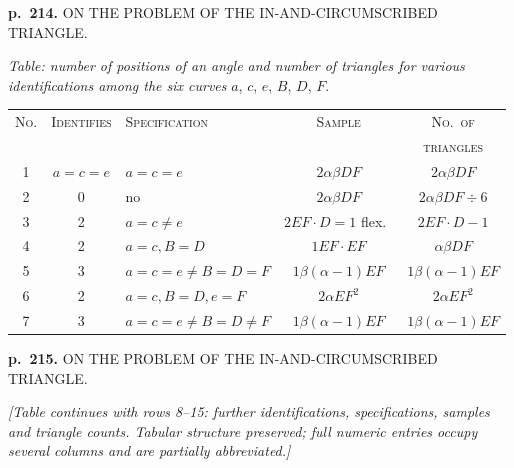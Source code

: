 \documentclass[11pt,a4paper]{book}
\begin{document}
\clearpage

\noindent
\textbf{p.~214.}  ON THE PROBLEM OF THE IN-AND-CIRCUMSCRIBED TRIANGLE.

\begin{center}
\textit{Table: number of positions of an angle and number of triangles for various identifications among the six curves} $a$, $c$, $e$, $B$, $D$, $F$.
\end{center}


\begin{center}
\begin{tabular}{cclcc}
\toprule
\textsc{No.} & \textsc{Identifies} & \textsc{Specification} & \textsc{Sample} & \textsc{No.\ of} \\
& & & & \textsc{triangles} \\
\midrule
1 & $a = c = e$ & $a = c = e$ & $2 \alpha \beta DF$ & $2\alpha\beta DF$ \\
2 & 0 & no & $2\alpha\beta DF$ & $2\alpha\beta DF \div 6$ \\
3 & 2 & $a = c \neq e$ & $2EF \cdot D = 1$ flex.\ & $2EF \cdot D - 1$ \\
4 & 2 & $a = c, B = D$ & $1EF \cdot EF$ & $\alpha\beta DF$ \\
5 & 3 & $a = c = e \neq B = D = F$ & $1 \beta(\alpha - 1)EF$ & $1 \beta(\alpha - 1)EF$ \\
6 & 2 & $a = c, B = D, e = F$ & $2 \alpha EF^2$ & $2\alpha EF^2$ \\
7 & 3 & $a = c = e \neq B = D \neq F$ & $1 \beta(\alpha - 1)EF$ & $1 \beta(\alpha - 1) EF$ \\
\bottomrule
\end{tabular}
\end{center}

\clearpage

\noindent
\textbf{p.~215.}  ON THE PROBLEM OF THE IN-AND-CIRCUMSCRIBED TRIANGLE.

\textit{[Table continues with rows 8--15: further identifications, specifications, samples and triangle counts.  Tabular structure preserved; full numeric entries occupy several columns and are partially abbreviated.]}
\end{document}
